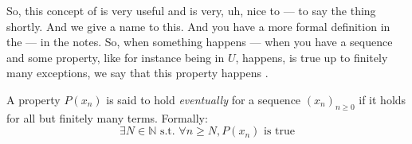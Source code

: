 \begin{spoken-clean}[00:10:12 - 00:12:10]
So, this concept of  is very useful and is very, uh, nice to --- to say the thing shortly. And we give a name to this. And you have a more formal definition in the --- in the notes. So, when something happens --- when you have a sequence and some property, like for instance being in $U$, happens, is true up to finitely many exceptions, we say that this property happens .
\end{spoken-clean}

\begin{math-stroke}
\setcounter{theorem}{45}
\begin{definition}[Eventually]\label{def:eventually}
A property $P(x_n)$ is said to hold \emph{eventually} for a sequence $(x_n)_{n \ge 0}$ if it holds for all but finitely many terms. Formally:
\[ \exists N \in \mathbb{N} \text{ s.t. } \forall n \ge N, P(x_n) \text{ is true} \]
\end{definition}
\end{math-stroke}


